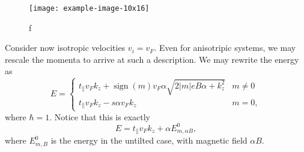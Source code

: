 \begin{figure}[h]
  \centering
  \texttt{[image: example-image-10x16]}
  \caption{f}
\end{figure}

Consider now isotropic velocities \( v_i = v_F \).
Even for anisotripic systems, we may rescale the momenta to arrive at such a description.
We may rewrite the energy as
\[
  E =
  \begin{cases}
    t_{\parallel} v_F k_z + \operatorname{sign}(m) v_F \alpha \sqrt{2 |m| e B \alpha + k_z^2} & m\neq 0\\
    t_{\parallel} v_F k_z - s \alpha v_F k_z & m=0,
  \end{cases}
\]
where \( \hbar = 1 \).
Notice that this is exactly
\[
E = t_{\parallel} v_F k_z + \alpha E^0_{m, \alpha B},
\]
where \( E^0_{m, B} \) is the energy in the untilted case, with magnetic field \( \alpha B \).

